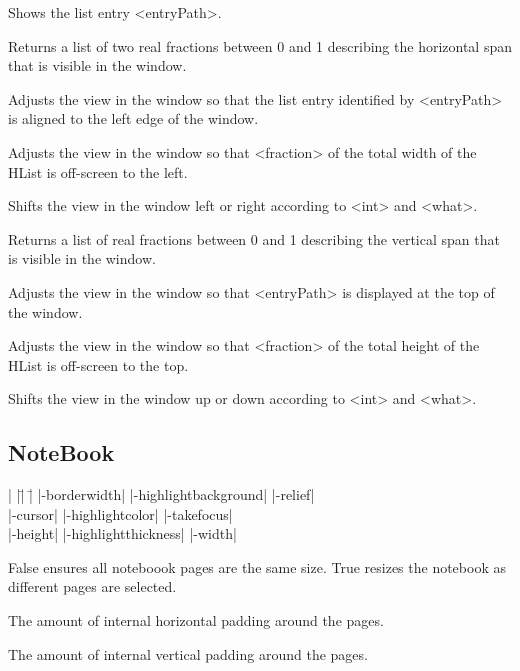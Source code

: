 \begin{enum}{1cm}
Shows the list entry <entryPath>. 

Returns a list of two real fractions between 0 and 1 describing the horizontal span that is visible in the window.

Adjusts the view in the window so that the list entry identified by <entryPath> is aligned to the left edge of the window. 

Adjusts the view in the window so that <fraction> of the total width of the HList is off-screen to the left.

Shifts the view in the window left or right according to <int> and <what>.

Returns a list of real fractions between 0 and 1 describing the vertical span that is visible in the window.

Adjusts the view in the window so that <entryPath> is displayed at the top of the window. 

Adjusts the view in the window so that <fraction> of the total height of the HList is off-screen to the top.

Shifts the view in the window up or down according to <int> and <what>.

\end{enum}

\subsection*{NoteBook}
\vspace{-4pt}

\begin{tabbing}
|                   |\=|                     |\= \kill
|-borderwidth|      \> |-highlightbackground| \> |-relief| \\
|-cursor|           \> |-highlightcolor|      \> |-takefocus| \\
|-height|	    \> |-highlightthickness|  \> |-width| \\
\end{tabbing}

\vskip5pt

\begin{enum}{1cm}

False ensures all noteboook pages are the same size.  True resizes the notebook 
as different pages are selected.

The amount of internal horizontal padding around the pages. 

The amount of internal vertical padding around the pages. 

\end{enum}

